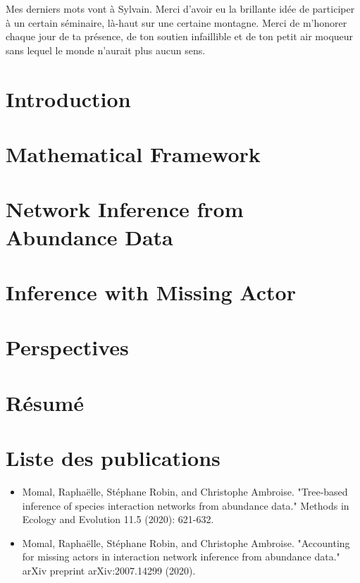 Mes derniers mots vont à Sylvain. Merci d'avoir eu la brillante idée de participer à un certain séminaire, là-haut sur une certaine montagne. Merci de m'honorer chaque jour de ta présence, de ton soutien infaillible et de ton petit air moqueur sans lequel le monde n'aurait plus aucun sens.
\tableofcontents 
 \mainmatter



\chapter{Introduction}

\clearemptydoublepage
\ActivateBG 
\chapter{Mathematical Framework}
 
 
\chapter{Network Inference from Abundance Data}

 
\chapter{Inference with Missing Actor}



\chapter{Perspectives}



\clearemptydoublepage
\DeactivateBG 
\chapter{Résumé}

\chapter*{Liste des publications}
\begin{itemize}
\item Momal, Raphaëlle, Stéphane Robin, and Christophe Ambroise. "Tree‐based inference of species interaction networks from abundance data." Methods in Ecology and Evolution 11.5 (2020): 621-632.\\
\item Momal, Raphaëlle, Stéphane Robin, and Christophe Ambroise. "Accounting for missing actors in interaction network inference from abundance data." arXiv preprint arXiv:2007.14299 (2020).
\end{itemize}
  


\clearemptydoublepage

